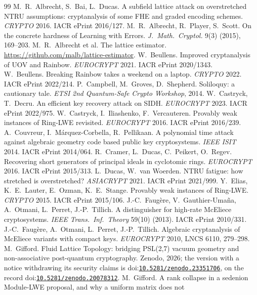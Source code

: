 \documentclass[11pt]{article}
\makeatletter
\theoremstyle{remark}
\DeclareRobustCommand{\_}{%
  \edef\@tempa{\ttdefault}%
  \ifx\f@family\@tempa\char95 \else\textunderscore\fi\penalty300\relax}
\newcommand{\doi}[1]{\href{https://doi.org/#1}{\nolinkurl{#1}}}
\makeatother
\begin{document}
\begin{thebibliography}{99}\small
{} M.~R.~Albrecht, S.~Bai, L.~Ducas. A subfield lattice attack on overstretched NTRU assumptions:
  cryptanalysis of some FHE and graded encoding schemes. \emph{CRYPTO} 2016. IACR ePrint 2016/127.
 M.~R.~Albrecht, R.~Player, S.~Scott. On the concrete hardness of Learning with Errors.
  \emph{J.\ Math.\ Cryptol.} 9(3) (2015), 169--203.
 M.~R.~Albrecht et al. The lattice estimator. \url{https://github.com/malb/lattice-estimator}.
 W.~Beullens. Improved cryptanalysis of UOV and Rainbow. \emph{EUROCRYPT} 2021. IACR ePrint 2020/1343.
 W.~Beullens. Breaking Rainbow takes a weekend on a laptop. \emph{CRYPTO} 2022. IACR ePrint 2022/214.
 P.~Campbell, M.~Groves, D.~Shepherd. Soliloquy: a cautionary tale. \emph{ETSI 2nd Quantum-Safe Crypto
  Workshop}, 2014.
 W.~Castryck, T.~Decru. An efficient key recovery attack on SIDH. \emph{EUROCRYPT} 2023. IACR ePrint
  2022/975.
 W.~Castryck, I.~Iliashenko, F.~Vercauteren. Provably weak instances of Ring-LWE revisited.
  \emph{EUROCRYPT} 2016. IACR ePrint 2016/239.
 A.~Couvreur, I.~M\'arquez-Corbella, R.~Pellikaan. A polynomial time attack against algebraic geometry
  code based public key cryptosystems. \emph{IEEE ISIT} 2014. IACR ePrint 2014/064.
 R.~Cramer, L.~Ducas, C.~Peikert, O.~Regev. Recovering short generators of principal ideals in
  cyclotomic rings. \emph{EUROCRYPT} 2016. IACR ePrint 2015/313.
 L.~Ducas, W.~van Woerden. NTRU fatigue: how stretched is overstretched? \emph{ASIACRYPT} 2021. IACR
  ePrint 2021/999.
 Y.~Elias, K.~E.~Lauter, E.~Ozman, K.~E.~Stange. Provably weak instances of Ring-LWE. \emph{CRYPTO}
  2015. IACR ePrint 2015/106.
 J.-C.~Faug\`ere, V.~Gauthier-Uma\~na, A.~Otmani, L.~Perret, J.-P.~Tillich. A distinguisher for
  high-rate McEliece cryptosystems. \emph{IEEE Trans.\ Inf.\ Theory} 59(10) (2013). IACR ePrint 2010/331.
 J.-C.~Faug\`ere, A.~Otmani, L.~Perret, J.-P.~Tillich. Algebraic cryptanalysis of McEliece variants
  with compact keys. \emph{EUROCRYPT} 2010, LNCS 6110, 279--298.
 M.~Gifford. Fluid Lattice Topology: bridging PSL(2,7) vacuum geometry and non-associative post-quantum
  cryptography. Zenodo, 2026; the version with a notice withdrawing its security claims is
  doi:\doi{10.5281/zenodo.23351706}, on the record doi:\doi{10.5281/zenodo.20078312}.
 M.~Gifford. A rank collapse in a sedenion Module-LWE proposal, and why a uniform matrix does not

\end{thebibliography}
\end{document}
